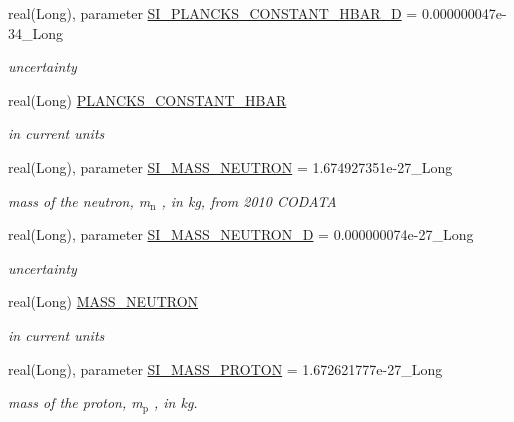 \begin{DoxyCompactItemize}
real(Long), parameter \hyperlink{namespaceclass__PhysicalConstants_a3d0c994c98a42bfcf113f5b427c36962}{SI\_\-PLANCKS\_\-CONSTANT\_\-HBAR\_\-D} = 0.000000047e-\/34\_\-Long
\begin{DoxyCompactList}\small\item\em uncertainty \item\end{DoxyCompactList}\item 
real(Long) \hyperlink{namespaceclass__PhysicalConstants_ae4331c74d5e362ec511a71f7a10d7c5b}{PLANCKS\_\-CONSTANT\_\-HBAR}
\begin{DoxyCompactList}\small\item\em in current units \item\end{DoxyCompactList}\item 
real(Long), parameter \hyperlink{namespaceclass__PhysicalConstants_ae630d55c57af72ecd1cf1b926512f9e4}{SI\_\-MASS\_\-NEUTRON} = 1.674927351e-\/27\_\-Long
\begin{DoxyCompactList}\small\item\em mass of the neutron, m$_{\mbox{n}}$ , in kg, from 2010 CODATA \item\end{DoxyCompactList}\item 
real(Long), parameter \hyperlink{namespaceclass__PhysicalConstants_a2a2b96dae5b376e21555324d6f18d7b4}{SI\_\-MASS\_\-NEUTRON\_\-D} = 0.000000074e-\/27\_\-Long
\begin{DoxyCompactList}\small\item\em uncertainty \item\end{DoxyCompactList}\item 
real(Long) \hyperlink{namespaceclass__PhysicalConstants_af0ecc86a3048c06a15619a67d8a21687}{MASS\_\-NEUTRON}
\begin{DoxyCompactList}\small\item\em in current units \item\end{DoxyCompactList}\item 
real(Long), parameter \hyperlink{namespaceclass__PhysicalConstants_a2449bd62711b0a1ee76be095516a13da}{SI\_\-MASS\_\-PROTON} = 1.672621777e-\/27\_\-Long
\begin{DoxyCompactList}\small\item\em mass of the proton, m$_{\mbox{p}}$ , in kg. \item\end{DoxyCompactList}\item 

\end{DoxyCompactItemize}
